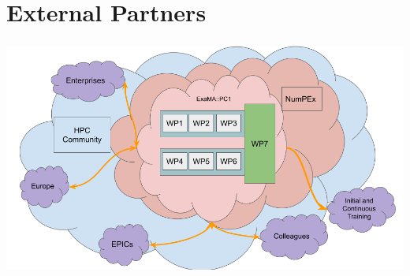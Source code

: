 \section*{External Partners}

\begin{frame}[plain]
  \frametitle{}
  \framesubtitle{}
\begin{center}
  \includegraphics[width=.9\linewidth]{../../figures/exama-relations.png}
\end{center}
  
\end{frame}

